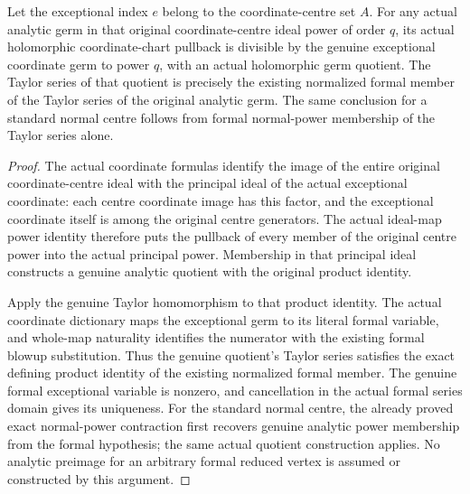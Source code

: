 \begin{theorem}
\label{hir:actual-analytic-blowup-exceptional-quotient-formal-dictionary}
\leanok
Let the exceptional index $e$ belong to the coordinate-centre set $A$.
For any actual analytic germ in that original coordinate-centre ideal power
of order $q$, its actual holomorphic coordinate-chart pullback is divisible
by the genuine exceptional coordinate germ to power $q$, with an actual
holomorphic germ quotient. The Taylor series of that quotient is precisely
the existing normalized formal member of the Taylor series of the original
analytic germ. The same conclusion for a standard normal centre follows
from formal normal-power membership of the Taylor series alone.
\end{theorem}
\begin{proof}
The actual coordinate formulas identify the image of the entire original
coordinate-centre ideal with the principal ideal of the actual exceptional
coordinate: each centre coordinate image has this factor, and the
exceptional coordinate itself is among the original centre generators.
The actual ideal-map power identity therefore puts the pullback of every
member of the original centre power into the actual principal power.
Membership in that principal ideal constructs a genuine analytic quotient
with the original product identity.

Apply the genuine Taylor homomorphism to that product identity. The actual
coordinate dictionary maps the exceptional germ to its literal formal
variable, and whole-map naturality identifies the numerator with the
existing formal blowup substitution. Thus the genuine quotient's Taylor
series satisfies the exact defining product identity of the existing
normalized formal member. The genuine formal exceptional variable is
nonzero, and cancellation in the actual formal series domain gives its
uniqueness. For the standard normal centre, the already proved exact
normal-power contraction first recovers genuine analytic power membership
from the formal hypothesis; the same actual quotient construction applies.
No analytic preimage for an arbitrary formal reduced vertex is assumed or
constructed by this argument.
\end{proof}
